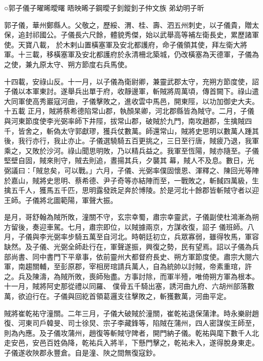 
\begin{pinyinscope}

 ○郭子儀子曜晞曖曙
 晤映晞子鋼曖子釗鏦釗子仲文族
 弟幼明子昕



 郭子儀，華州鄭縣人。父敬之，歷綏、渭、桂、壽、泗五州刺史，以子儀貴，贈太保，追封祁國公。子儀長六尺餘，體貌秀傑，始以武舉高等補左衛長史，累歷諸軍使。天寶八載，
 於木剌山置橫塞軍及安北都護府，命子儀領其使，拜左衛大將軍。十三載，移橫塞軍及安北都護府於永清柵北築城，仍改橫塞為天德軍，子儀為之使，兼九原太守、朔方節度右兵馬使。



 十四載，安祿山反。十一月，以子儀為衛尉卿，兼靈武郡太守，充朔方節度使，詔子儀以本軍東討。遂舉兵出單于府，收靜邊軍，斬賊將周萬頃，傳首闕下。祿山遣大同軍使高秀巖寇河曲，子儀擊敗之，進收雲中馬邑，開東陘，以功加御史大夫。十五載
 正月，賊將蔡希德陷常山郡，執顏杲卿，河北郡縣皆為賊守。二月，子儀與河東節度使李光弼率師下井陘，拔常山郡，破賊於九門，南攻趙郡，生擒賊四千，皆舍之，斬偽太守郭獻璆，獲兵仗數萬。師還常山，賊將史思明以數萬人踵其後，我行亦行，我止亦止。子儀選驍騎五百更挑之，三日至行唐，賊疲乃退，我軍乘之，又敗於沙河。祿山聞思明敗，乃以精兵益之。我軍至恆陽，賊亦隨至。子儀堅壁自固，賊來則守，賊去則追，晝揚其兵，夕襲其
 幕，賊人不及息。數日，光弼議曰：「賊怠矣，可以戰。」六月，子儀、光弼率僕固懷恩、渾釋之、陳回光等陣於嘉山，賊將史思明、蔡希德、尹子奇等亦結陣而至，一戰敗之，斬馘四萬級，生擒五千人，獲馬五千匹，思明露發跣足奔於博陵。於是河北十餘郡皆斬賊守者以迎王師。子儀將北圖範陽，軍聲大振。



 是月，哥舒翰為賊所敗，潼關不守，玄宗幸蜀，肅宗幸靈武，子儀副使杜鴻漸為朔方留後，奏迎車駕。七月，肅宗即位，以賊據兩京，方謀收復，詔子
 儀班師。八月，子儀與李光弼率步騎五萬至自河北。時朝廷初立，兵眾寡弱，雖得牧馬，軍容缺然。及子儀、光弼全師赴行在，軍聲遂振，興復之勢，民有望焉。詔以子儀為兵部尚書、同中書門下平章事，依前靈州大都督府長史、朔方軍節度使。肅宗大閱六軍，南趨關輔，至彭原郡，宰相房琯請兵萬人，自為統帥以討賊，帝素重琯，許之。兵及陳濤，為賊所敗，喪師殆盡。方事討除，而軍半殪，唯倚朔方軍為根本。十一月，賊將阿史那從禮以同羅、
 僕骨五千騎出塞，誘河曲九府、六胡州部落數萬，欲迫行在。子儀與回紇首領葛邏支往擊敗之，斬獲數萬，河曲平定。



 賊將崔乾祐守潼關。二年三月，子儀大破賊於潼關，崔乾祐退保蒲津。時永樂尉趙復、河東司戶韓旻、司士徐炅、宗子李藏鋒等，陷賊在蒲州，四人密謀俟王師至，則為內應。及子儀攻蒲州，趙復等斬賊守陴者，開門納子儀。乾祐與麾下數千人北走安邑，安邑百姓偽降，乾祐兵入將半，下懸門擊之，乾祐未入，遂得脫身東走。
 子儀遂收陜郡永豐倉。自是潼、陜之間無復寇鈔。




\end{pinyinscope}
